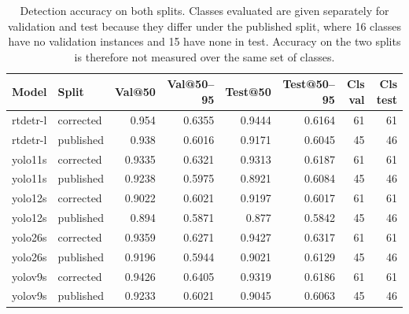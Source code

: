 \begin{table}[t]
  \centering
  \caption{Detection accuracy on both splits. Classes evaluated are given separately for validation and test because they differ under the published split, where 16 classes have no validation instances and 15 have none in test. Accuracy on the two splits is therefore not measured over the same set of classes.}
  \label{tab:main-results}
  \begin{tabular}{llrrrrrr}
    \toprule
    Model & Split & Val@50 & Val@50--95 & Test@50 & Test@50--95 & Cls val & Cls test \\
    \midrule
    rtdetr-l & corrected & 0.954 & 0.6355 & 0.9444 & 0.6164 & 61 & 61 \\
    rtdetr-l & published & 0.938 & 0.6016 & 0.9171 & 0.6045 & 45 & 46 \\
    yolo11s & corrected & 0.9335 & 0.6321 & 0.9313 & 0.6187 & 61 & 61 \\
    yolo11s & published & 0.9238 & 0.5975 & 0.8921 & 0.6084 & 45 & 46 \\
    yolo12s & corrected & 0.9022 & 0.6021 & 0.9197 & 0.6017 & 61 & 61 \\
    yolo12s & published & 0.894 & 0.5871 & 0.877 & 0.5842 & 45 & 46 \\
    yolo26s & corrected & 0.9359 & 0.6271 & 0.9427 & 0.6317 & 61 & 61 \\
    yolo26s & published & 0.9196 & 0.5944 & 0.9021 & 0.6129 & 45 & 46 \\
    yolov9s & corrected & 0.9426 & 0.6405 & 0.9319 & 0.6186 & 61 & 61 \\
    yolov9s & published & 0.9233 & 0.6021 & 0.9045 & 0.6063 & 45 & 46 \\
    \bottomrule
  \end{tabular}
\end{table}
